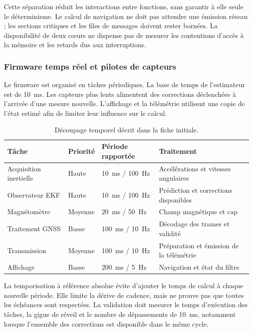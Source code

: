 Cette séparation réduit les interactions entre fonctions, sans garantir à elle seule le déterminisme. Le calcul de navigation ne doit pas attendre une émission réseau ; les sections critiques et les files de messages doivent rester bornées. La disponibilité de deux cœurs ne dispense pas de mesurer les contentions d'accès à la mémoire et les retards dus aux interruptions.

\subsubsection{Firmware temps réel et pilotes de capteurs}

Le firmware est organisé en tâches périodiques. La base de temps de l'estimateur est de 10~ms. Les capteurs plus lents alimentent des corrections déclenchées à l'arrivée d'une mesure nouvelle. L'affichage et la télémétrie utilisent une copie de l'état estimé afin de limiter leur influence sur le calcul.

\begin{table}[!htbp]\centering\small
\begin{tabularx}{\linewidth}{|L{3.5cm}|L{2.0cm}|L{3.0cm}|Y|}\hline
{}\textbf{Tâche} & \textbf{Priorité} & \textbf{Période rapportée} & \textbf{Traitement}\\\hline
Acquisition inertielle & Haute & 10~ms / 100~Hz & Accélérations et vitesses angulaires\\\hline
Observateur EKF & Haute & 10~ms / 100~Hz & Prédiction et corrections disponibles\\\hline
Magnétomètre & Moyenne & 20~ms / 50~Hz & Champ magnétique et cap\\\hline
Traitement GNSS & Basse & 100~ms / 10~Hz & Décodage des trames et validité\\\hline
Transmission & Moyenne & 100~ms / 10~Hz & Préparation et émission de la télémétrie\\\hline
Affichage & Basse & 200~ms / 5~Hz & Navigation et état du filtre\\\hline
\end{tabularx}
\caption{Découpage temporel décrit dans la fiche initiale.}
\end{table}

La temporisation à référence absolue évite d'ajouter le temps de calcul à chaque nouvelle période. Elle limite la dérive de cadence, mais ne prouve pas que toutes les échéances sont respectées. La validation doit mesurer le temps d'exécution des tâches, la gigue de réveil et le nombre de dépassements de 10~ms, notamment lorsque l'ensemble des corrections est disponible dans le même cycle.

